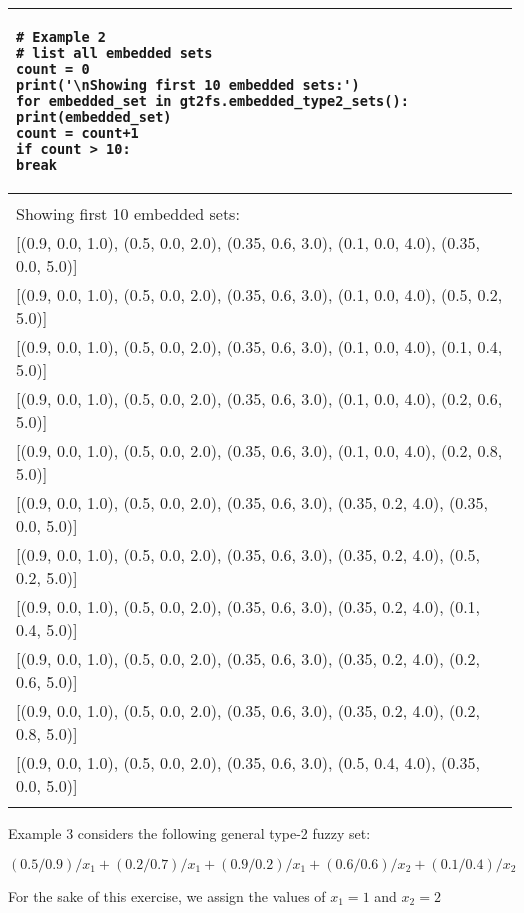 \documentclass[]{article}
\begin{document}
\begin{tabular}{|l|}
\hline 
\lstset{language=Python}
\lstset{basicstyle=\scriptsize}
\begin{lstlisting}
# Example 2
# list all embedded sets
count = 0
print('\nShowing first 10 embedded sets:')
for embedded_set in gt2fs.embedded_type2_sets():
print(embedded_set)
count = count+1
if count > 10:
break
\end{lstlisting}
\\
\hline
\\
{\small Showing first 10 embedded sets:}\\
{\small [(0.9, 0.0, 1.0), (0.5, 0.0, 2.0), (0.35, 0.6, 3.0), (0.1, 0.0, 4.0), (0.35, 0.0, 5.0)]}\\
{\small [(0.9, 0.0, 1.0), (0.5, 0.0, 2.0), (0.35, 0.6, 3.0), (0.1, 0.0, 4.0), (0.5, 0.2, 5.0)]}\\
{\small [(0.9, 0.0, 1.0), (0.5, 0.0, 2.0), (0.35, 0.6, 3.0), (0.1, 0.0, 4.0), (0.1, 0.4, 5.0)]}\\
{\small [(0.9, 0.0, 1.0), (0.5, 0.0, 2.0), (0.35, 0.6, 3.0), (0.1, 0.0, 4.0), (0.2, 0.6, 5.0)]}\\
{\small [(0.9, 0.0, 1.0), (0.5, 0.0, 2.0), (0.35, 0.6, 3.0), (0.1, 0.0, 4.0), (0.2, 0.8, 5.0)]}\\
{\small [(0.9, 0.0, 1.0), (0.5, 0.0, 2.0), (0.35, 0.6, 3.0), (0.35, 0.2, 4.0), (0.35, 0.0, 5.0)]}\\
{\small [(0.9, 0.0, 1.0), (0.5, 0.0, 2.0), (0.35, 0.6, 3.0), (0.35, 0.2, 4.0), (0.5, 0.2, 5.0)]}\\
{\small [(0.9, 0.0, 1.0), (0.5, 0.0, 2.0), (0.35, 0.6, 3.0), (0.35, 0.2, 4.0), (0.1, 0.4, 5.0)]}\\
{\small [(0.9, 0.0, 1.0), (0.5, 0.0, 2.0), (0.35, 0.6, 3.0), (0.35, 0.2, 4.0), (0.2, 0.6, 5.0)]}\\
{\small [(0.9, 0.0, 1.0), (0.5, 0.0, 2.0), (0.35, 0.6, 3.0), (0.35, 0.2, 4.0), (0.2, 0.8, 5.0)]}\\
{\small [(0.9, 0.0, 1.0), (0.5, 0.0, 2.0), (0.35, 0.6, 3.0), (0.5, 0.4, 4.0), (0.35, 0.0, 5.0)]}\\
\\
\hline 
\end{tabular} 

\bigskip

Example 3 considers the following general type-2 fuzzy set:

\[
(0.5/0.9)/x_1 + (0.2/0.7)/x_1 + (0.9/0.2)/x_1 + (0.6/0.6)/x_2 + (0.1/0.4)/x_2
\]

For the sake of this exercise, we assign the values of $x_1 = 1$ and $x_2=2$
\end{document}
